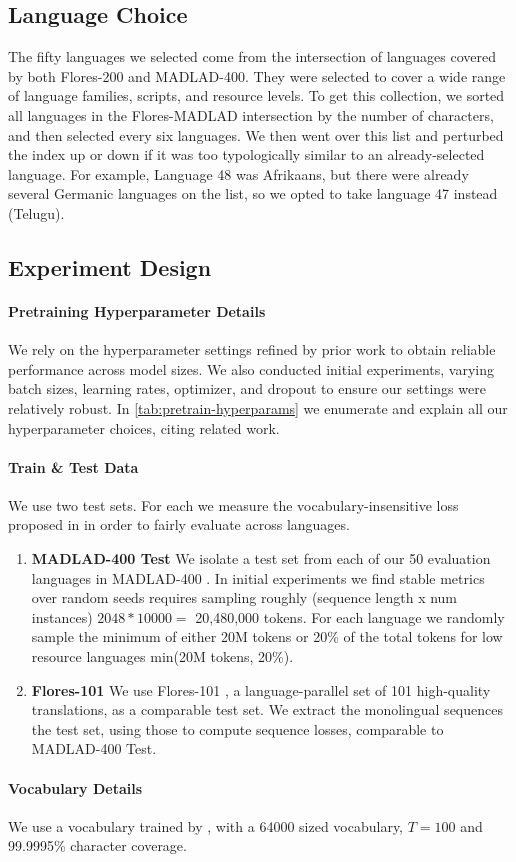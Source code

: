 

\subsection{Language Choice} 

The fifty languages we selected come from the intersection of languages covered by both Flores-200 and MADLAD-400. They were selected to cover a wide range of language families, scripts, and resource levels. To get this collection, we sorted all languages in the Flores-MADLAD intersection by the number of characters, and then selected every six languages. We then went over this list and perturbed the index up or down if it was too typologically similar to an already-selected language. For example, Language 48 was Afrikaans, but there were already several Germanic languages on the list, so we opted to take language 47 instead (Telugu). 

\subsection{Experiment Design}

\paragraph{Pretraining Hyperparameter Details}
We rely on the hyperparameter settings refined by prior work to obtain reliable performance across model sizes. We also conducted initial experiments, varying batch sizes, learning rates, optimizer, and dropout to ensure our settings were relatively robust.
In \cref{tab:pretrain-hyperparams} we enumerate and explain all our hyperparameter choices, citing related work.

\paragraph{Train \& Test Data}
We use two test sets. For each we measure the vocabulary-insensitive loss proposed in \citet{tao2024scaling} in order to fairly evaluate across languages. 
\begin{enumerate}
    \item \textbf{MADLAD-400 Test} We isolate a test set from each of our 50 evaluation languages in MADLAD-400 \citep{kudugunta2024madlad}.
    In initial experiments we find stable metrics over random seeds requires sampling roughly (sequence length x num instances) $2048*10000=$ 20,480,000 tokens.
    For each language we randomly sample the minimum of either 20M tokens or 20\% of the total tokens for low resource languages min(20M tokens, 20\%).
    \item \textbf{Flores-101} We use Flores-101 \citep{flores101}, a language-parallel set of 101 high-quality translations, as a comparable test set. We extract the monolingual sequences the test set, using those to compute sequence losses, comparable to MADLAD-400 Test.
\end{enumerate}


\paragraph{Vocabulary Details} We use a vocabulary trained by \citeauthor{kudugunta2024madlad}, with a 64000 sized vocabulary, $T=100$ and 99.9995\% character coverage.






